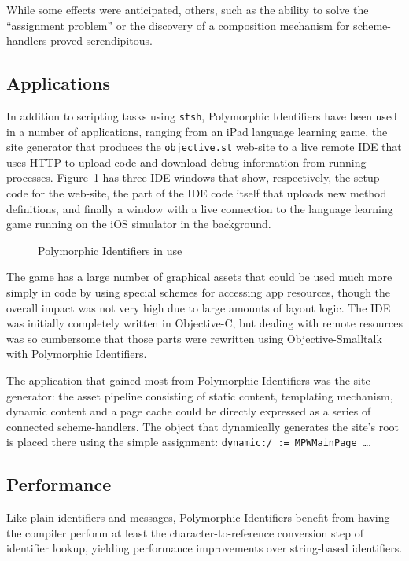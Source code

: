 \documentclass[preprint]{sigplanconf}
\begin{document}
While some effects were anticipated, others, such as the ability to solve the
``assignment problem'' or the discovery of a composition mechanism for
scheme-handlers proved serendipitous.  



\subsection{Applications}

In addition to scripting tasks using {\tt stsh}, Polymorphic Identifiers have been used in a number
of applications, ranging from an iPad language learning game, the site generator that produces the {\tt objective.st} web-site to a
live remote IDE that uses HTTP to upload code and download debug information from running processes.  Figure~\ref{pi-inuse}
has three IDE windows that show, respectively, the setup code for the web-site, the part of the IDE code itself that uploads new method definitions,
and finally a window with a live connection to the language learning game running on the iOS simulator in the background.

\begin{figure}[htbp]
\centering
\caption{Polymorphic Identifiers in use}
\label{pi-inuse}
\end{figure}


The game has a large number of graphical assets that could be used much more simply in code by using special schemes for accessing app
resources, though the overall impact was not very high due to large amounts of layout logic. 
 The IDE was initially completely written in Objective-C, but dealing with remote resources was so cumbersome that
those parts were rewritten using Objective-Smalltalk with Polymorphic Identifiers.

The application that gained most from Polymorphic Identifiers was the site generator:  the asset pipeline consisting of static
content, templating mechanism, dynamic content and a page cache could be directly expressed as a series of connected
scheme-handlers.  The object that dynamically generates the site's root is placed there using the simple assignment: {\tt dynamic:/  := MPWMainPage \dots}.


\subsection{Performance}

Like plain identifiers and messages, Polymorphic Identifiers benefit from having the compiler perform
at least the character-to-reference conversion step of identifier lookup, yielding performance 
improvements over string-based identifiers.
\end{document}
